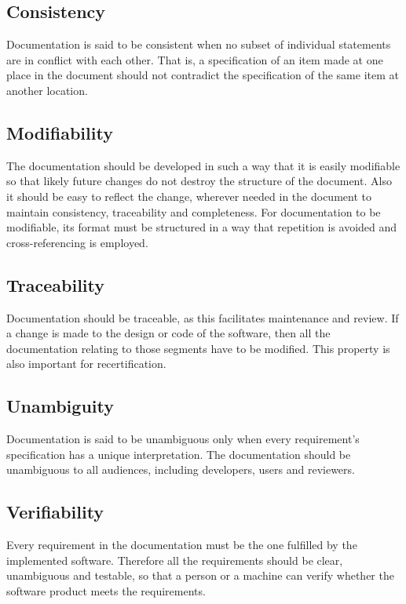 \documentclass[12pt]{article}
\begin{document}
\subsection{Consistency}

Documentation is said to be consistent when no subset of individual statements
are in conflict with each other. That is, a specification of an item made at one
place in the document should not contradict the specification of the same item
at another location.

\subsection{Modifiability}

The documentation should be developed in such a way that it is easily modifiable
so that likely future changes do not destroy the structure of the document. Also
it should be easy to reflect the change, wherever needed in the document to
maintain consistency, traceability and completeness. For documentation to be
modifiable, its format must be structured in a way that repetition is avoided
and cross-referencing is employed.

\subsection{Traceability}

Documentation should be traceable, as this facilitates maintenance and
review. If a change is made to the design or code of the software, then all the
documentation relating to those segments have to be modified.  This property is
also important for recertification.

\subsection{Unambiguity}

Documentation is said to be unambiguous only when every requirement's
specification has a unique interpretation.  The documentation should be
unambiguous to all audiences, including developers, users and reviewers.

\subsection{Verifiability}

Every requirement in the documentation must be the one fulfilled by the
implemented software. Therefore all the requirements should be clear,
unambiguous and testable, so that a person or a machine can verify whether the
software product meets the requirements.
\end{document}
